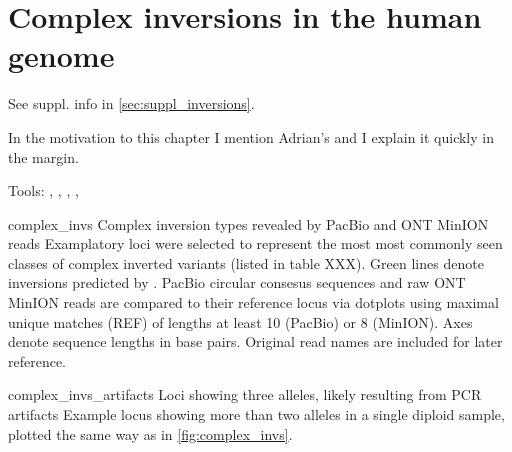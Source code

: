 \chapter{Complex inversions in the human genome}
\label{sec:inversions}

See suppl. info in \cref{sec:suppl_inversions}.

In the motivation to this chapter I mention Adrian's  and I explain it quickly in the margin.


Tools: \blasr, \last, \mummer, \bwamem, \quiver


%
%
%

    {complex_invs}
    {Complex inversion types revealed by PacBio and ONT MinION reads}
    {Examplatory loci were selected to represent the most most commonly seen
    classes of complex inverted variants (listed in table XXX).
    Green lines denote inversions predicted by \delly. PacBio circular
    consesus sequences and raw ONT MinION reads are compared to their reference
    locus via dotplots using maximal unique matches (REF) of
    lengths at least 10 (PacBio) or 8 (MinION). Axes denote sequence lengths in
    base pairs. Original read names are included for later reference.}

    {complex_invs_artifacts}
    {Loci showing three alleles, likely resulting from PCR artifacts}
    {Example locus showing more than two alleles in a single diploid sample,
    plotted the same way as in \cref{fig:complex_invs}.}
